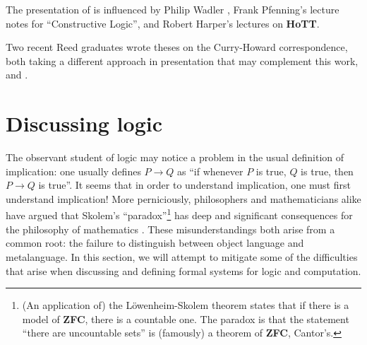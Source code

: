 \documentclass[12pt,twoside]{reedthesis}
\makeatletter
\let\oldindex\index
\renewcommand{\index}[1]
               {\oldindex{#1}\marginpar{\footnotesize\color{index}index: #1}}
\newcommand{\indeX}{\oldindex}
\newcommand{\indeX}{\index}
\newcommand{\TODO}[1]{\marginpar{\footnotesize\color{TODO}todo: #1}}
\newcommand{\abbreviation}[1]{\textbf{#1}\indeX{#1@\textbf{#1}}} %
\newcommand{\define}[1]{\textbf{#1}} %
\newtheorem{notation}[theorem]{Notation}
\makeatother
\begin{document}
The presentation of  is influenced by
Philip Wadler \cite{wadler-propositions}, Frank Pfenning's lecture notes for
``Constructive Logic'', and Robert Harper's lectures on
\abbreviation{HoTT}.\TODO{citation}

Two recent Reed graduates wrote theses on the Curry-Howard correspondence, both
taking a different approach in presentation that may complement this work,
\cite{curry-howard-reed-thesis} and \cite{process-calculi-reed-thesis}.


\section{Discussing logic}
\label{sec:discussing-logic}

The observant student of logic may notice a problem in the usual definition of
implication: one usually defines $P→ Q$ as ``if whenever $P$ is true,
$Q$ is true, then $P→ Q$ is true''. It seems that in order to understand
implication, one must first understand implication! More perniciously,
philosophers and mathematicians alike have argued that Skolem's
``paradox''\footnote{(An application of) the L\"owenheim-Skolem theorem states
  that if there is a model of \abbreviation{ZFC}, there is a countable one.
  The paradox is that the statement ``there are uncountable sets'' is (famously)
  a theorem of \abbreviation{ZFC}, Cantor's.}
has deep and significant consequences for the philosophy of
mathematics \cite{skolem}. These misunderstandings both arise from a common
root: the failure to distinguish between object language and metalanguage. In
this section, we will attempt to mitigate some of the difficulties that arise
when discussing and defining formal systems for logic and computation.

\end{document}
